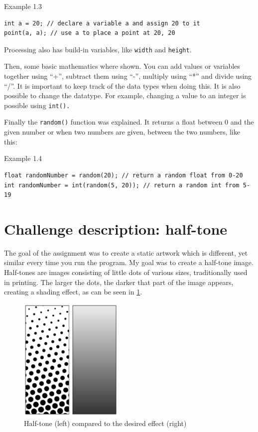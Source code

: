 \begin{codebox}{Example 1.3}
    \begin{lstlisting}
int a = 20; // declare a variable a and assign 20 to it
point(a, a); // use a to place a point at 20, 20
    \end{lstlisting}
\end{codebox}

Processing also has build-in variables, like \texttt{width} and \texttt{height}.

Then, some basic mathematics where shown. You can add values or variables together using ``+'', subtract them using ``-'', multiply using ``*'' and divide using ``/''. It is important to keep track of the data types when doing this. It is also possible to change the datatype. For example, changing a value to an integer is possible using \texttt{int().}

Finally the \texttt{random()} function was explained. It returns a float between 0 and the given number or when two numbers are given, between the two numbers, like this:

\begin{codebox}{Example 1.4}
    \begin{lstlisting}
float randomNumber = random(20); // return a random float from 0-20
int randomNumber = int(random(5, 20)); // return a random int from 5-19
    \end{lstlisting}
\end{codebox}

\section{Challenge description: half-tone}

The goal of the assignment was to create a static artwork which is different, yet similar every time you run the program. My goal was to create a half-tone image. Half-tones are images consisting of little dots of various sizes, traditionally used in printing. The larger the dots, the darker that part of the image appears, creating a shading effect, as can be seen in \cref{fig: half-tone}.

\begin{figure}[H]
    \centering
    \includegraphics[width = 5cm]{Figures/day_1/half_tone.png}
    \caption{Half-tone (left) compared to the desired effect (right)}
    \label{fig: half-tone}
\end{figure}

